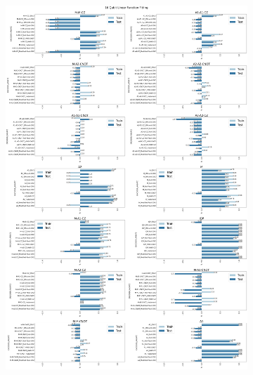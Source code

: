 \documentclass[journal=jacsat,manuscript=article]{achemso}
\begin{document}
\begin{figure}[H]
	\centering
	\begin{subfigure}[b]{\textwidth}
		\centering
		\includegraphics[width=\textwidth]{images/Function_Fitting/16qubit_Linear_funcfit_R2.png}
		\caption{}
		\label{fig:16qubit_Linear_funcfit_R2}
	\end{subfigure}
	\hfill
	\begin{subfigure}[b]{\textwidth}
		\centering

\end{subfigure}
\end{figure}
\end{document}
